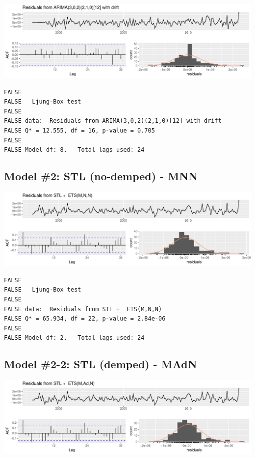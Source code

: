 \documentclass[openany]{book}
\begin{document}
\includegraphics{Part-B-AS_files/figure-latex/unnamed-chunk-4-1.pdf}

\begin{verbatim}
FALSE 
FALSE   Ljung-Box test
FALSE 
FALSE data:  Residuals from ARIMA(3,0,2)(2,1,0)[12] with drift
FALSE Q* = 12.555, df = 16, p-value = 0.705
FALSE 
FALSE Model df: 8.   Total lags used: 24
\end{verbatim}

\hypertarget{model-2-stl-no-demped---mnn}{%
\subsection{Model \#2: STL (no-demped) -
MNN}\label{model-2-stl-no-demped---mnn}}

\includegraphics{Part-B-AS_files/figure-latex/unnamed-chunk-5-1.pdf}

\begin{verbatim}
FALSE 
FALSE   Ljung-Box test
FALSE 
FALSE data:  Residuals from STL +  ETS(M,N,N)
FALSE Q* = 65.934, df = 22, p-value = 2.84e-06
FALSE 
FALSE Model df: 2.   Total lags used: 24
\end{verbatim}

\hypertarget{model-2-2-stl-demped---madn}{%
\subsection{Model \#2-2: STL (demped) -
MAdN}\label{model-2-2-stl-demped---madn}}

\includegraphics{Part-B-AS_files/figure-latex/unnamed-chunk-6-1.pdf}
\end{document}
